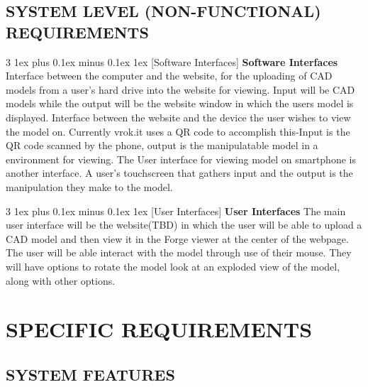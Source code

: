 \documentclass[letterpaper, 10pt, draftclsnofoot, compsoc, onecolumn]{IEEEtran}
\makeatletter
\def\subsubsection{\@startsection{subsubsection}%
                                 {3}%
                                 {\z@}%
                                 {1ex plus 0.1ex minus 0.1ex}%
                                 {1ex}%
                                 {\normalfont\normalsize}}%
\makeatother
\begin{document}
\subsection[SYSTEM LEVEL (NON{}-FUNCTIONAL)
REQUIREMENTS]{\rmfamily\bfseries\color{black}
SYSTEM LEVEL (NON-FUNCTIONAL) REQUIREMENTS}

\subsubsection[Software
Interfaces]{\rmfamily\bfseries\color{black}
Software Interfaces}
	Interface between the computer and the website, for the uploading of CAD models from a user's hard drive into the 
	website for viewing. Input will be CAD models while the output will be the website window in which the users model 
	is displayed. Interface between the website and the device the user wishes to view the model on. Currently vrok.it uses a 
	QR code to accomplish this-Input is the QR code scanned by the phone, output is the manipulatable model in a environment 
	for viewing. The User interface for viewing model on smartphone is another interface. A user's touchscreen that gathers 
	input and the output is the manipulation they make to the model.

\subsubsection[User
Interfaces]{\rmfamily\bfseries\color{black}
User Interfaces}
	The main user interface will be the website(TBD) in which the user will be able to upload a CAD model and then view it in 
	the Forge viewer at the center of the webpage. The user will be able interact with the model through use of their 
	mouse. They will have options to rotate the model look at an exploded view of the model, along with other options. 

\section[SPECIFIC
REQUIREMENTS]{\rmfamily\bfseries\color{black}
SPECIFIC REQUIREMENTS}
\bigskip

\subsection[SYSTEM
FEATURES]{\rmfamily\bfseries\color{black}
SYSTEM FEATURES}
\medskip
\end{document}
